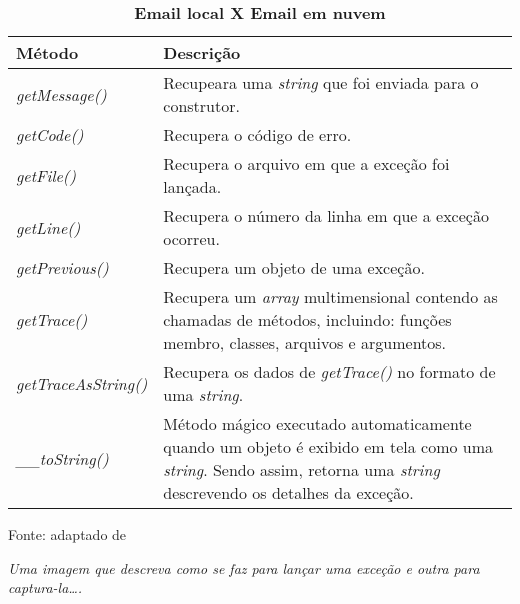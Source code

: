 \begin{table}[h!tb]
	\centering
	\setlength{\belowcaptionskip}{9pt}
	\caption[Métodos públicos da classe \textit{Exception}]{\textbf{Email local X
	Email em nuvem}}
	\begin{tabular}{ l | p{} }
	
		\hline
		\textbf{Método}
		& \textbf{Descrição} \\
		\hline
		
        \textit{getMessage()} 		
        & Recupeara uma \textit{string} que foi enviada
        para o construtor.
        
        \\ \cline{1-2}
        \textit{getCode()} 			
        & Recupera o código de erro.
        \\ \cline{1-2}
        
        \textit{getFile()} 			
        & Recupera o arquivo em que a exceção foi lançada.
        \\ \cline{1-2}
        
        \textit{getLine()} 			
        & Recupera o número da linha em que a exceção ocorreu.
        \\ \cline{1-2}
        
        \textit{getPrevious()} 		
        & Recupera um objeto de uma exceção.
        \\ \cline{1-2}
        
        \textit{getTrace()} 		
        & Recupera um \textit{array} multimensional contendo as chamadas de
        métodos, incluindo: funções membro, classes, arquivos e argumentos. \\
        \cline{1-2}
        
        \textit{getTraceAsString()} 
        & Recupera os dados de \textit{getTrace()} no formato de uma
        \textit{string}.
        \\ \cline{1-2}
        
        \textit{\_\_toString()} 		
        & Método mágico executado automaticamente quando um objeto é exibido em
        tela como uma \textit{string}. Sendo assim, retorna uma \textit{string}
        descrevendo os detalhes da exceção.
        \\
        \hline
	\end{tabular}
	\newline
	\newline
	\label{tab:excecao}
	\begin{footnotesize}
		Fonte: adaptado de \cite[p.53]{phpObjectsPatternsAndPractice}
	\end{footnotesize}
\end{table}

\FloatBarrier 	%

\textit{Uma imagem que descreva como se faz para lançar uma exceção e outra
para captura-la\ldots.}